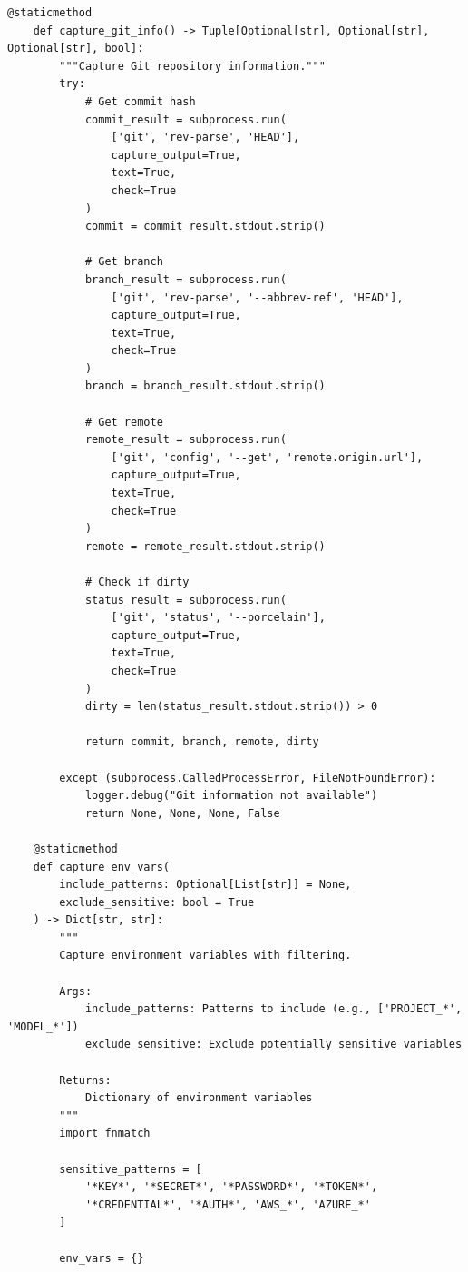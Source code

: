 \begin{lstlisting}[style=python, caption={Complete environment snapshot system}]
    @staticmethod
    def capture_git_info() -> Tuple[Optional[str], Optional[str], Optional[str], bool]:
        """Capture Git repository information."""
        try:
            # Get commit hash
            commit_result = subprocess.run(
                ['git', 'rev-parse', 'HEAD'],
                capture_output=True,
                text=True,
                check=True
            )
            commit = commit_result.stdout.strip()

            # Get branch
            branch_result = subprocess.run(
                ['git', 'rev-parse', '--abbrev-ref', 'HEAD'],
                capture_output=True,
                text=True,
                check=True
            )
            branch = branch_result.stdout.strip()

            # Get remote
            remote_result = subprocess.run(
                ['git', 'config', '--get', 'remote.origin.url'],
                capture_output=True,
                text=True,
                check=True
            )
            remote = remote_result.stdout.strip()

            # Check if dirty
            status_result = subprocess.run(
                ['git', 'status', '--porcelain'],
                capture_output=True,
                text=True,
                check=True
            )
            dirty = len(status_result.stdout.strip()) > 0

            return commit, branch, remote, dirty

        except (subprocess.CalledProcessError, FileNotFoundError):
            logger.debug("Git information not available")
            return None, None, None, False

    @staticmethod
    def capture_env_vars(
        include_patterns: Optional[List[str]] = None,
        exclude_sensitive: bool = True
    ) -> Dict[str, str]:
        """
        Capture environment variables with filtering.

        Args:
            include_patterns: Patterns to include (e.g., ['PROJECT_*', 'MODEL_*'])
            exclude_sensitive: Exclude potentially sensitive variables

        Returns:
            Dictionary of environment variables
        """
        import fnmatch

        sensitive_patterns = [
            '*KEY*', '*SECRET*', '*PASSWORD*', '*TOKEN*',
            '*CREDENTIAL*', '*AUTH*', 'AWS_*', 'AZURE_*'
        ]

        env_vars = {}


\end{lstlisting}
